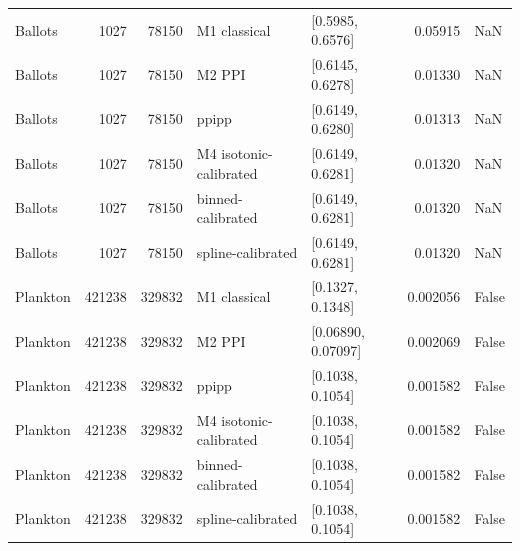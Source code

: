 \begin{tabular}{lrrllrl}
Ballots & 1027 & 78150 & M1 classical & [0.5985, 0.6576] & 0.05915 & NaN \\
Ballots & 1027 & 78150 & M2 PPI & [0.6145, 0.6278] & 0.01330 & NaN \\
Ballots & 1027 & 78150 & ppipp & [0.6149, 0.6280] & 0.01313 & NaN \\
Ballots & 1027 & 78150 & M4 isotonic-calibrated & [0.6149, 0.6281] & 0.01320 & NaN \\
Ballots & 1027 & 78150 & binned-calibrated & [0.6149, 0.6281] & 0.01320 & NaN \\
Ballots & 1027 & 78150 & spline-calibrated & [0.6149, 0.6281] & 0.01320 & NaN \\
Plankton & 421238 & 329832 & M1 classical & [0.1327, 0.1348] & 0.002056 & False \\
Plankton & 421238 & 329832 & M2 PPI & [0.06890, 0.07097] & 0.002069 & False \\
Plankton & 421238 & 329832 & ppipp & [0.1038, 0.1054] & 0.001582 & False \\
Plankton & 421238 & 329832 & M4 isotonic-calibrated & [0.1038, 0.1054] & 0.001582 & False \\
Plankton & 421238 & 329832 & binned-calibrated & [0.1038, 0.1054] & 0.001582 & False \\
Plankton & 421238 & 329832 & spline-calibrated & [0.1038, 0.1054] & 0.001582 & False \\
\bottomrule
\end{tabular}
